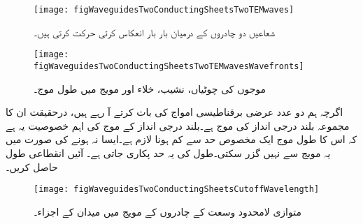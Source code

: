 \begin{figure}
\centering
\texttt{[image: figWaveguidesTwoConductingSheetsTwoTEMwaves]}
\caption{شعاعیں دو چادروں کے درمیان بار بار انعکاس کرتی حرکت کرتی ہیں۔}
\label{شکل_مویج_شعاع_انعکاس_کرتی_حرکت_کرتی_ہے}
\end{figure}
%
\begin{figure}
\centering
\texttt{[image: figWaveguidesTwoConductingSheetsTwoTEMwavesWavefronts]}
\caption{موجوں کی چوٹیاں، نشیب، خلاء اور مویج میں طول موج۔}
\label{شکل_مویج_خالی_خلاء_اور_مویج_طول-موج}
\end{figure}

اگرچہ ہم دو عدد عرضی برقناطیسی  امواج کی بات کرتے آ رہے ہیں، درحقیقت ان کا مجموعہ بلند درجی  انداز کی موج ہے۔بلند درجی انداز کے موج کی اہم خصوصیت  یہ ہے کہ اس کا طول موج ایک مخصوص حد سے کم ہونا لازم ہے۔ایسا نہ ہونے کی صورت میں یہ مویج سے نہیں گزر سکتی۔طول کی یہ حد  پکاری جاتی ہے۔ آئیں انقطاعی طول حاصل کریں۔

 \begin{figure}
\centering
\texttt{[image: figWaveguidesTwoConductingSheetsCutoffWavelength]}
\caption{متوازی لامحدود وسعت کے چادروں کے مویج میں میدان کے اجزاء۔}
\label{شکل_مویج_متوازی_چادر_مویج_اجزاء_میدان}
\end{figure}

